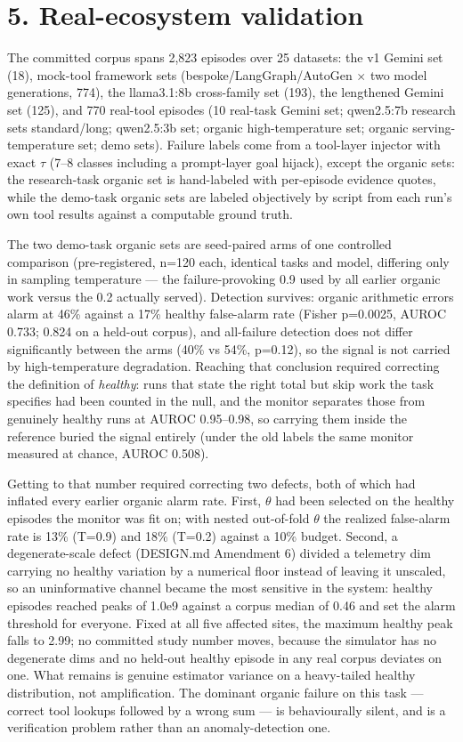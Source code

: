 \documentclass[11pt]{article}
\begin{document}
\section{5. Real-ecosystem validation}


The committed corpus spans 2,823 episodes over 25 datasets: the v1 Gemini set (18), mock-tool framework sets (bespoke/LangGraph/AutoGen $\times$ two model generations, 774), the llama3.1:8b cross-family set (193), the lengthened Gemini set (125), and 770 real-tool episodes (10 real-task Gemini set; qwen2.5:7b research sets standard/long; qwen2.5:3b set; organic high-temperature set; organic serving-temperature set; demo sets). Failure labels come from a tool-layer injector with exact $\tau$ (7--8 classes including a prompt-layer goal hijack), except the organic sets: the research-task organic set is hand-labeled with per-episode evidence quotes, while the demo-task organic sets are labeled objectively by script from each run's own tool results against a computable ground truth.


The two demo-task organic sets are seed-paired arms of one controlled comparison (pre-registered, n=120 each, identical tasks and model, differing only in sampling temperature --- the failure-provoking 0.9 used by all earlier organic work versus the 0.2 actually served). Detection survives: organic arithmetic errors alarm at 46\% against a 17\% healthy false-alarm rate (Fisher p=0.0025, AUROC 0.733; 0.824 on a held-out corpus), and all-failure detection does not differ significantly between the arms (40\% vs 54\%, p=0.12), so the signal is not carried by high-temperature degradation. Reaching that conclusion required correcting the definition of \emph{healthy}: runs that state the right total but skip work the task specifies had been counted in the null, and the monitor separates those from genuinely healthy runs at AUROC 0.95--0.98, so carrying them inside the reference buried the signal entirely (under the old labels the same monitor measured at chance, AUROC 0.508).


Getting to that number required correcting two defects, both of which had inflated every earlier organic alarm rate. First, $\theta$ had been selected on the healthy episodes the monitor was fit on; with nested out-of-fold $\theta$ the realized false-alarm rate is 13\% (T=0.9) and 18\% (T=0.2) against a 10\% budget. Second, a degenerate-scale defect (DESIGN.md Amendment 6) divided a telemetry dim carrying no healthy variation by a numerical floor instead of leaving it unscaled, so an uninformative channel became the most sensitive in the system: healthy episodes reached peaks of 1.0e9 against a corpus median of 0.46 and set the alarm threshold for everyone. Fixed at all five affected sites, the maximum healthy peak falls to 2.99; no committed study number moves, because the simulator has no degenerate dims and no held-out healthy episode in any real corpus deviates on one. What remains is genuine estimator variance on a heavy-tailed healthy distribution, not amplification. The dominant organic failure on this task --- correct tool lookups followed by a wrong sum --- is behaviourally silent, and is a verification problem rather than an anomaly-detection one.
\end{document}
